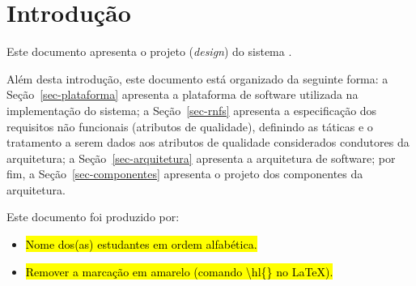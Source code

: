 \chapter{Introdução}
\label{sec-intro}
\vspace{-1cm}

Este documento apresenta o projeto (\textit{design}) do sistema \emph{\imprimirtitulo}. 


Além desta introdução, este documento está organizado da seguinte forma: 
	a Seção~\ref{sec-plataforma} apresenta a plataforma de software utilizada na implementação do sistema;
	a Seção~\ref{sec-rnfs} apresenta a especificação dos requisitos não funcionais (atributos de qualidade), definindo as táticas e o tratamento a serem dados aos atributos de qualidade considerados condutores da arquitetura; 
	a Seção~\ref{sec-arquitetura} apresenta a arquitetura de software; por fim, 
	a Seção~\ref{sec-componentes} apresenta o projeto dos componentes da arquitetura.
	
Este documento foi produzido por:
\begin{itemize}
	\item \hl{Nome dos(as) estudantes em ordem alfabética.}
	\item \hl{Remover a marcação em amarelo (comando \textbackslash hl\{\} no \LaTeX).}
\end{itemize}

